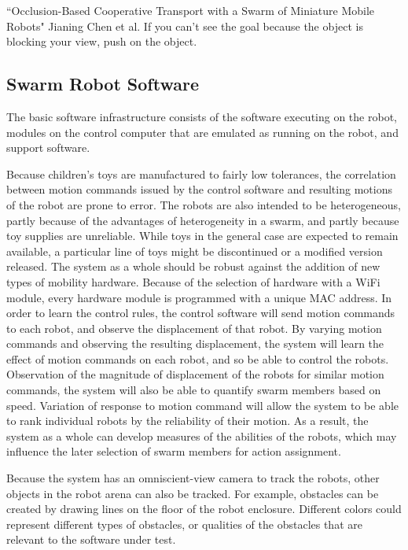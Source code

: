 \documentclass[]{article}
\begin{document}

``Occlusion-Based Cooperative Transport with a Swarm of Miniature Mobile Robots" Jianing Chen et al. If you can't see the goal because the object is blocking your view, push on the object. 

\subsection{Swarm Robot Software}

The basic software infrastructure consists of the software executing on the robot, modules on the control computer that are emulated as running on the robot, and support software. 

Because children's toys are manufactured to fairly low tolerances, the correlation between motion commands issued by the control software and resulting motions of the robot are prone to error. 
The robots are also intended to be heterogeneous, partly because of the advantages of heterogeneity in a swarm, and partly because toy supplies are unreliable.
While toys in the general case are expected to remain available, a particular line of toys might be discontinued or a modified version released. 
The system as a whole should be robust against the addition of new types of mobility hardware. 
Because of the selection of hardware with a WiFi module, every hardware module is programmed with a unique MAC address. 
In order to learn the control rules, the control software will send motion commands to each robot, and observe the displacement of that robot. 
By varying motion commands and observing the resulting displacement, the system will learn the effect of motion commands on each robot, and so be able to control the robots. 
Observation of the magnitude of displacement of the robots for similar motion commands, the system will also be able to quantify swarm members based on speed. 
Variation of response to motion command will allow the system to be able to rank individual robots by the reliability of their motion. 
As a result, the system as a whole can develop measures of the abilities of the robots, which may influence the later selection of swarm members for action assignment. 

Because the system has an omniscient-view camera to track the robots, other objects in the robot arena can also be tracked. 
For example, obstacles can be created by drawing lines on the floor of the robot enclosure. 
Different colors could represent different types of obstacles, or qualities of the obstacles that are relevant to the software under test. 
\end{document}
